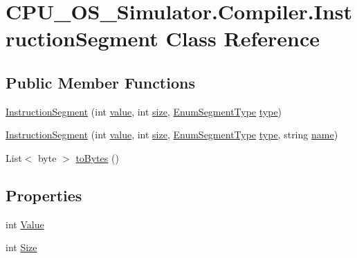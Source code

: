 \hypertarget{class_c_p_u___o_s___simulator_1_1_compiler_1_1_instruction_segment}{}\section{C\+P\+U\+\_\+\+O\+S\+\_\+\+Simulator.\+Compiler.\+Instruction\+Segment Class Reference}
\label{class_c_p_u___o_s___simulator_1_1_compiler_1_1_instruction_segment}
\subsection*{Public Member Functions}
\begin{DoxyCompactItemize}
\item 
\hyperlink{class_c_p_u___o_s___simulator_1_1_compiler_1_1_instruction_segment_a7527be7b5f737230c36648e4d9774a19}{Instruction\+Segment} (int \hyperlink{class_c_p_u___o_s___simulator_1_1_compiler_1_1_instruction_segment_acdf33d1614b2f7c9125f97793d0b6f8b}{value}, int \hyperlink{class_c_p_u___o_s___simulator_1_1_compiler_1_1_instruction_segment_a3fbe26c38889c028d98a423f91824a9f}{size}, \hyperlink{namespace_c_p_u___o_s___simulator_1_1_compiler_aa05e0a6530329354660230dd223cca81}{Enum\+Segment\+Type} \hyperlink{class_c_p_u___o_s___simulator_1_1_compiler_1_1_instruction_segment_aa6b21639fca4949423b6a4d0473450be}{type})
\item 
\hyperlink{class_c_p_u___o_s___simulator_1_1_compiler_1_1_instruction_segment_aba9cbbcf68c9577c5a263d9692f2efde}{Instruction\+Segment} (int \hyperlink{class_c_p_u___o_s___simulator_1_1_compiler_1_1_instruction_segment_acdf33d1614b2f7c9125f97793d0b6f8b}{value}, int \hyperlink{class_c_p_u___o_s___simulator_1_1_compiler_1_1_instruction_segment_a3fbe26c38889c028d98a423f91824a9f}{size}, \hyperlink{namespace_c_p_u___o_s___simulator_1_1_compiler_aa05e0a6530329354660230dd223cca81}{Enum\+Segment\+Type} \hyperlink{class_c_p_u___o_s___simulator_1_1_compiler_1_1_instruction_segment_aa6b21639fca4949423b6a4d0473450be}{type}, string \hyperlink{class_c_p_u___o_s___simulator_1_1_compiler_1_1_instruction_segment_a00b501a442f98f8541515c708eda0b2f}{name})
\item 
List$<$ byte $>$ \hyperlink{class_c_p_u___o_s___simulator_1_1_compiler_1_1_instruction_segment_aa75fb3d98ca3ed0434f1d8a77689e621}{to\+Bytes} ()
\end{DoxyCompactItemize}
\subsection*{Properties}
\begin{DoxyCompactItemize}
\item 
int \hyperlink{class_c_p_u___o_s___simulator_1_1_compiler_1_1_instruction_segment_a1e8c5f60cda7233d75e61d44cc43b6b8}{Value}
\item 
int \hyperlink{class_c_p_u___o_s___simulator_1_1_compiler_1_1_instruction_segment_a6bdea24d923f03277868b53412a6a424}{Size}
\end{DoxyCompactItemize}
